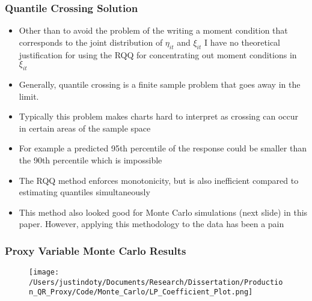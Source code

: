 \documentclass{beamer}
\begin{document}
\begin{frame}
\frametitle{Quantile Crossing Solution}
\begin{itemize}
	\item Other than to avoid the problem of the writing a moment condition that corresponds to the joint distribution of $\eta_{it}$ and $\xi_{it}$ I have no theoretical justification for using the RQQ for concentrating out moment conditions in $\xi_{it}$
	\item Generally, quantile crossing is a finite sample problem that goes away in the limit.
	\item Typically this problem makes charts hard to interpret as crossing can occur in certain areas of the sample space
	\item For example a predicted 95th percentile of the response could be smaller than the 90th percentile which is impossible
	\item The RQQ method enforces monotonicity, but is also inefficient compared to estimating quantiles simultaneously
	\item This method also looked good for Monte Carlo simulations (next slide) in this paper. However, applying this methodology to the data has been a pain
\end{itemize}
\end{frame}

\begin{frame}
\frametitle{Proxy Variable Monte Carlo Results}
\begin{figure}[ht]
\centering
\texttt{[image: /Users/justindoty/Documents/Research/Dissertation/Production\_QR\_Proxy/Code/Monte\_Carlo/LP\_Coefficient\_Plot.png]}
\end{figure}
\end{frame}

\end{document}
